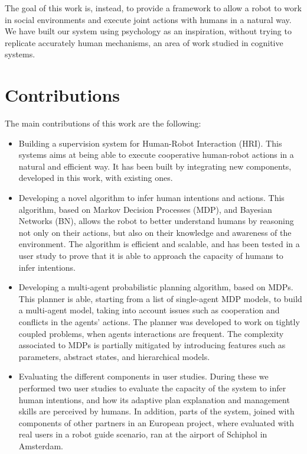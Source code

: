 The goal of this work is, instead, to provide a framework to allow a robot to work in social environments and execute joint actions with humans in a natural way. We have built our system using psychology as an inspiration, without trying to replicate accurately human mechanisms, an area of work studied in cognitive systems. 

\section*{Contributions}

The main contributions of this work are the following:
\begin{itemize}
\item Building a supervision system for Human-Robot Interaction (HRI). This systems aims at being able to execute cooperative human-robot actions in a natural and efficient way. It has been built by integrating new components, developed in this work, with existing ones.
\item Developing a novel algorithm to infer human intentions and actions. This algorithm, based on Markov Decision Processes (MDP), and Bayesian Networks (BN), allows the robot to better understand humans by reasoning not only on their actions, but also on their knowledge and awareness of the environment. The algorithm is efficient and scalable, and has been tested in a user study to prove that it is able to approach the capacity of humans to infer intentions.
\item Developing a multi-agent probabilistic planning algorithm, based on MDPs. This planner is able, starting from a list of single-agent MDP models, to build a multi-agent model, taking into account issues such as cooperation and conflicts in the agents' actions. The planner was developed to work on tightly coupled problems, when agents interactions are frequent. The complexity associated to MDPs is partially mitigated by introducing features such as parameters, abstract states, and hierarchical models.
\item Evaluating the different components in user studies. During these we performed two user studies to evaluate the capacity of the system to infer human intentions, and how its adaptive plan explanation and management skills are perceived by humans. In addition, parts of the system, joined with components of other partners in an European project, where evaluated with real users in a robot guide scenario, ran at the airport of Schiphol in Amsterdam.
\end{itemize}

